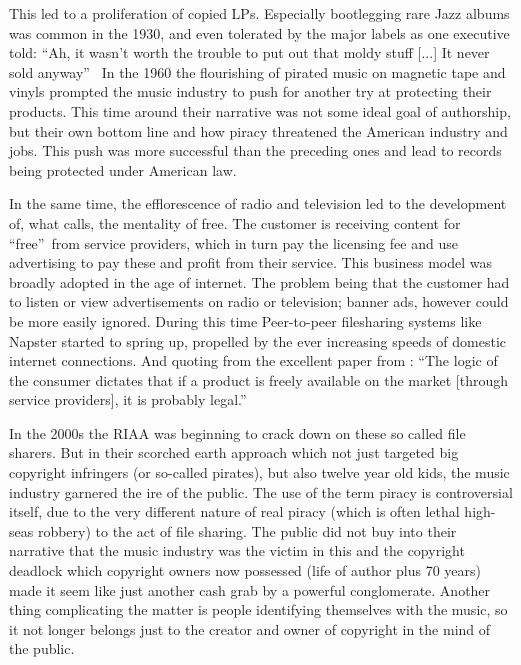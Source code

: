 \documentclass[a4paper]{report}
\begin{document}
This led to a proliferation of copied LPs. Especially bootlegging rare Jazz albums was common in the 1930, and even tolerated by the major labels as one executive told: \textquotedblleft Ah, it wasn't worth the trouble to put out that moldy stuff [...] It never sold anyway\textquotedblright\ \parencite{Cummings2017}
In the 1960 the flourishing of pirated music on magnetic tape and vinyls prompted the music industry to push for another try at protecting their products. This time around their narrative was not some ideal goal of authorship, but their own bottom line and how piracy threatened the American industry and jobs. This push was more successful than the preceding ones and lead to records being protected under American law.

In the same time, the efflorescence of radio and television led to the development of, what \cite{Lin2013} calls, the mentality of free. The customer is receiving content for \textquotedblleft free\textquotedblright\ from service providers, which in turn pay the licensing fee and use advertising to pay these and profit from their service. This business model was broadly adopted in the age of internet. The problem being that the customer had to listen or view advertisements on radio or television; banner ads, however could be more easily ignored. During this time Peer-to-peer filesharing systems like Napster started to spring up, propelled by the ever increasing speeds of domestic internet connections. And quoting from the excellent paper from \cite{Lunceford2008}: \textquotedblleft The logic of the consumer dictates that if a product is freely available on the market [through service providers], it is probably  legal.\textquotedblright

In the 2000s the RIAA was beginning to crack down on these so called file sharers. But in their scorched earth approach which not just targeted big copyright infringers (or so-called pirates), but also twelve year old kids, the music industry garnered the ire of the public. The use of the term piracy is controversial itself, due to the very different nature of real piracy (which is often lethal high-seas robbery) to the act of file sharing. The public did not buy into their narrative that the music industry was the victim in this and the copyright deadlock which copyright owners now possessed (life of author plus 70 years) made it seem like just another cash grab by a powerful conglomerate. Another thing complicating the matter is people identifying themselves with the music, so it not longer belongs just to the creator and owner of copyright in the mind of the public. \parencite{Lunceford2008}
\end{document}
